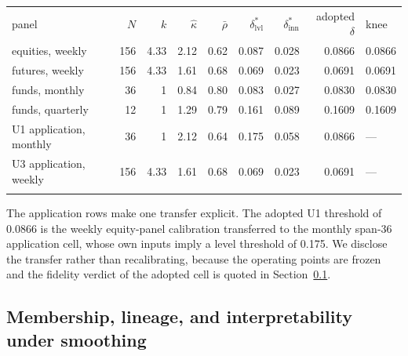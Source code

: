 \documentclass{rQUF2e}
\theoremstyle{plain}
\theoremstyle{remark}
\begin{document}
\begin{table}
\begin{center}
{\begin{tabular}{lrrrrrrrl}
\toprule
panel & $N$ & $k$ & $\widehat{\kappa}$ & $\bar{\rho}$
 & $\delta^{*}_{\mathrm{lvl}}$ & $\delta^{*}_{\mathrm{inn}}$
 & adopted $\delta$ & knee \\
\colrule
equities, weekly & 156 & 4.33 & 2.12 & 0.62 & 0.087 & 0.028 & 0.0866
 & 0.0866 \\
futures, weekly & 156 & 4.33 & 1.61 & 0.68 & 0.069 & 0.023 & 0.0691
 & 0.0691 \\
funds, monthly & 36 & 1 & 0.84 & 0.80 & 0.083 & 0.027 & 0.0830 & 0.0830 \\
funds, quarterly & 12 & 1 & 1.29 & 0.79 & 0.161 & 0.089 & 0.1609 & 0.1609 \\
\colrule
U1 application, monthly & 36 & 1 & 2.12 & 0.64 & 0.175 & 0.058 & 0.0866
 & --- \\
U3 application, weekly & 156 & 4.33 & 1.61 & 0.68 & 0.069 & 0.023 & 0.0691
 & --- \\
\botrule
\end{tabular}}
\label{tab:bridge}
\end{center}
\end{table}

The application rows make one transfer explicit. The adopted U1 threshold of
0.0866 is the weekly equity-panel calibration transferred to the monthly
span-36 application cell, whose own inputs imply a level threshold of 0.175.
We disclose the transfer rather than recalibrating, because the operating
points are frozen and the fidelity verdict of the adopted cell is quoted in
Section~\ref{sec:membership}.

\subsection{Membership, lineage, and interpretability under smoothing}
\label{sec:membership}
\end{document}
